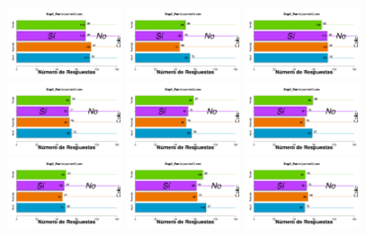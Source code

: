 \documentclass[a4paper ]{article}
\begin{document}
\begin{figure}[th]
\includegraphics[width=0.3\textwidth]{Figures/BiasColor_Exp2_P10} \includegraphics[width=0.3\textwidth]{Figures/BiasColor_Exp2_P11} \includegraphics[width=0.3\textwidth]{Figures/BiasColor_Exp2_P12}
\includegraphics[width=0.3\textwidth]{Figures/BiasColor_Exp2_P13} \includegraphics[width=0.3\textwidth]{Figures/BiasColor_Exp2_P14} \includegraphics[width=0.3\textwidth]{Figures/BiasColor_Exp2_P15}
\includegraphics[width=0.3\textwidth]{Figures/BiasColor_Exp2_P16} \includegraphics[width=0.3\textwidth]{Figures/BiasColor_Exp2_P17} \includegraphics[width=0.3\textwidth]{Figures/BiasColor_Exp2_P18}

\end{figure}
\end{document}
